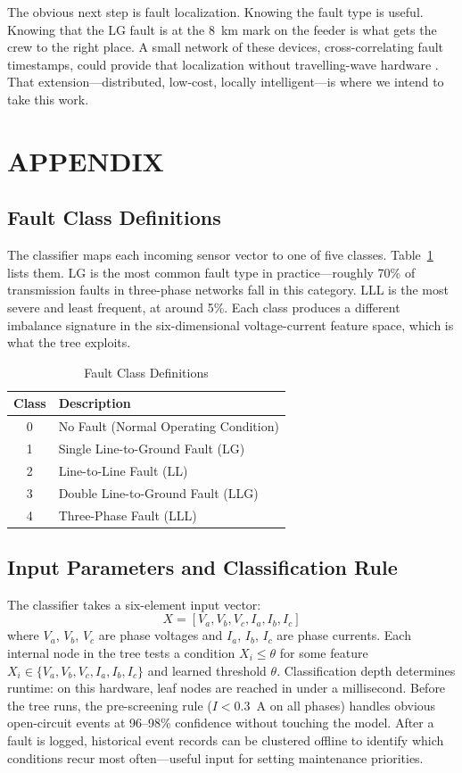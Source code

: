 \documentclass[journal]{IEEEtran}
\begin{document}
The obvious next step is fault localization. Knowing the fault type is useful. Knowing that the LG fault is at the 8~km mark on the feeder is what gets the crew to the right place. A small network of these devices, cross-correlating fault timestamps, could provide that localization without travelling-wave hardware \cite{ref17,ref23}. That extension---distributed, low-cost, locally intelligent---is where we intend to take this work.


\section{APPENDIX}
\subsection{Fault Class Definitions}
The classifier maps each incoming sensor vector to one of five classes. Table~\ref{tab:fault_classes} lists them. LG is the most common fault type in practice---roughly 70\% of transmission faults in three-phase networks fall in this category. LLL is the most severe and least frequent, at around 5\%. Each class produces a different imbalance signature in the six-dimensional voltage-current feature space, which is what the tree exploits.

\begin{table}[h]
\centering
\caption{Fault Class Definitions}
\label{tab:fault_classes}
\begin{tabular}{|c|l|}
\hline
\textbf{Class} & \textbf{Description} \\ \hline
0 & No Fault (Normal Operating Condition) \\ \hline
1 & Single Line-to-Ground Fault (LG) \\ \hline
2 & Line-to-Line Fault (LL) \\ \hline
3 & Double Line-to-Ground Fault (LLG) \\ \hline
4 & Three-Phase Fault (LLL) \\ \hline
\end{tabular}
\end{table}

\subsection{Input Parameters and Classification Rule}
The classifier takes a six-element input vector:
\begin{equation}
X = [V_a, V_b, V_c, I_a, I_b, I_c]
\end{equation}
where $V_a$, $V_b$, $V_c$ are phase voltages and $I_a$, $I_b$, $I_c$ are phase currents. Each internal node in the tree \cite{ref20} tests a condition $X_i \leq \theta$ for some feature $X_i \in \{V_a, V_b, V_c, I_a, I_b, I_c\}$ and learned threshold $\theta$. Classification depth determines runtime: on this hardware, leaf nodes are reached in under a millisecond. Before the tree runs, the pre-screening rule ($I < 0.3$~A on all phases) handles obvious open-circuit events at 96--98\% confidence without touching the model. After a fault is logged, historical event records can be clustered \cite{ref16} offline to identify which conditions recur most often---useful input for setting maintenance priorities.
\end{document}
